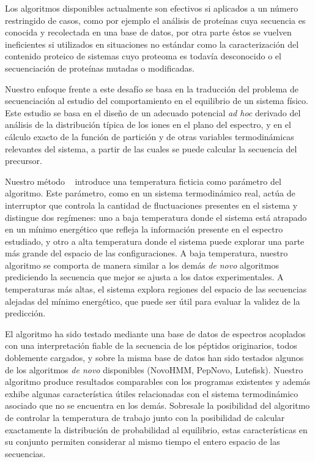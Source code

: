 Los algoritmos disponibles actualmente son efectivos si aplicados a un número restringido
de casos, como por ejemplo el análisis de proteínas cuya secuencia es conocida y
recolectada en una base de datos, por otra parte éstos se vuelven ineficientes si utilizados en
situaciones no estándar como la caracterización del contenido proteico de
sistemas cuyo proteoma es todavía desconocido o el secuenciación de
proteínas mutadas o modificadas.

Nuestro enfoque frente a este desafío se basa en la traducción del problema de
secuenciación al estudio del comportamiento en el equilibrio de un sistema
físico. Este estudio se basa en el
diseño de un adecuado potencial \emph{ad hoc} derivado del análisis de la
distribución típica de los iones en el plano del espectro, y en el cálculo
exacto de la función de partición y de otras variables termodinámicas relevantes
del sistema, a partir de las cuales se puede calcular la secuencia del precursor.

Nuestro método \ournovo~ introduce una temperatura ficticia como parámetro del
algoritmo.
Este parámetro, como en un sistema termodinámico real, actúa de interruptor
que controla la cantidad de fluctuaciones presentes en el sistema y
distingue dos regímenes:
uno a baja temperatura donde el sistema está atrapado en un mínimo energético
que refleja la información presente en el espectro estudiado, y otro a alta
temperatura donde el sistema puede explorar una parte más grande del espacio de
las configuraciones.
A baja temperatura, nuestro algoritmo se comporta de manera
similar a los demás \emph{de novo} algoritmos prediciendo la secuencia que 
mejor se ajusta a los datos experimentales. A temperaturas más altas, el sistema
explora regiones del espacio de las secuencias alejadas del mínimo energético,
que puede ser útil para evaluar la validez de la predicción. 


El algoritmo ha sido testado mediante una base de datos de espectros
acoplados con una interpretación fiable de la secuencia de los péptidos
originarios, todos doblemente cargados, y sobre la misma base de datos han sido testados
algunos de los algoritmos \emph{de novo} disponibles (NovoHMM, PepNovo, Lutefisk).
Nuestro algoritmo produce resultados comparables con los programas existentes
y además exhibe algunas característica útiles relacionadas con el sistema
termodinámico asociado que no se encuentra en los demás.
Sobresale la posibilidad del algoritmo de controlar la temperatura de trabajo
junto con la posibilidad de calcular exactamente la distribución de
probabilidad al equilibrio, estas características en su conjunto permiten considerar al
mismo tiempo el entero espacio de las secuencias.

